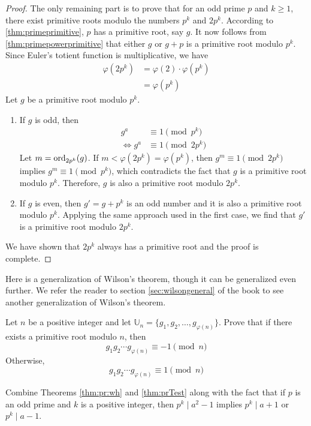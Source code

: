 \documentclass{subfile}
\begin{document}
\begin{proof}
		The only remaining part is to prove that for an odd prime $p$ and $k \geq 1$, there exist primitive roots modulo the numbers $p^k$ and $2p^k$. According to \autoref{thm:primeprimitive}, $p$ has a primitive root, say $g$. It now follows from \autoref{thm:primepowerprimitive} that either $g$ or $g+p$ is a primitive root modulo $p^k$. Since Euler's totient function is multiplicative, we have
			\begin{align*}
				\varphi(2p^k)
					& = \varphi(2)\cdot \varphi(p^k)\\
					& = \varphi(p^k)
			\end{align*}
		Let $g$ be a primitive root modulo $p^k$.
		\begin{enumerate}
			\item If $g$ is odd, then
			\begin{align*}
				g^a
					& \equiv 1 \pmod{p^k}\\
				\iff g^a
					& \equiv 1 \pmod{2p^k}
			\end{align*}
			Let $m = \operatorname{ord}_{2p^k}(g)$. If $m<\varphi(2p^k)=\varphi(p^k)$, then $g^m \equiv 1\pmod{2p^k}$ implies $g^m \equiv 1\pmod{p^k}$, which contradicts the fact that $g$ is a primitive root modulo $p^k$. Therefore, $g$ is also a primitive root modulo $2p^k$.
			\item If $g$ is even, then $g'=g+p^k$ is an odd number and it is also a primitive root modulo $p^k$. Applying the same approach used in the first case, we find that $g'$ is a primitive root modulo $2p^k$.
		\end{enumerate}
		We have shown that $2p^k$ always has a primitive root and the proof is complete.
	\end{proof}

Here is a generalization of Wilson's theorem, though it can be generalized even further. We refer the reader to section \eqref{sec:wilsongeneral} of the book to see another generalization of Wilson's theorem.
	\begin{problem}\label{thm:genWilson}
		Let $n$ be a positive integer and let $\mathbb U_n = \{g_1, g_2, \ldots, g_{\varphi(n)}\}$. Prove that if there exists a primitive root modulo $n$, then
		\[g_1g_2\cdots g_{\varphi(n)}\equiv-1\pmod n\]
		Otherwise,
		\[g_1g_2\cdots g_{\varphi(n)}\equiv1\pmod n\]
	\end{problem}

	\begin{hint}
		Combine Theorems \ref{thm:pr:wh} and \ref{thm:prTest} along with the fact that if $p$ is an odd prime and $k$ is a positive integer, then $p^k \mid a^2-1$ implies $p^k \mid a+1$ or $p^k\mid a-1$.
	\end{hint}
\end{document}
